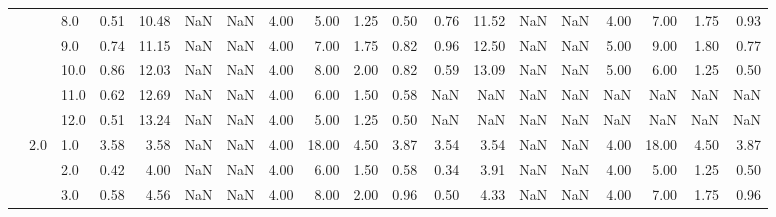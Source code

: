 \begin{tabular}{lllrrrrrrrrrrrrrrrr}
       &     & 8.0  &      0.51 &      10.48 &               NaN &                NaN & 4.00 &   5.00 &             1.25 &                         0.50 &      0.76 &      11.52 &               NaN &                NaN & 4.00 &   7.00 &             1.75 &                         0.93 \\
       &     & 9.0  &      0.74 &      11.15 &               NaN &                NaN & 4.00 &   7.00 &             1.75 &                         0.82 &      0.96 &      12.50 &               NaN &                NaN & 5.00 &   9.00 &             1.80 &                         0.77 \\
       &     & 10.0 &      0.86 &      12.03 &               NaN &                NaN & 4.00 &   8.00 &             2.00 &                         0.82 &      0.59 &      13.09 &               NaN &                NaN & 5.00 &   6.00 &             1.25 &                         0.50 \\
       &     & 11.0 &      0.62 &      12.69 &               NaN &                NaN & 4.00 &   6.00 &             1.50 &                         0.58 &       NaN &        NaN &               NaN &                NaN &  NaN &    NaN &              NaN &                          NaN \\
       &     & 12.0 &      0.51 &      13.24 &               NaN &                NaN & 4.00 &   5.00 &             1.25 &                         0.50 &       NaN &        NaN &               NaN &                NaN &  NaN &    NaN &              NaN &                          NaN \\
       & 2.0 & 1.0  &      3.58 &       3.58 &               NaN &                NaN & 4.00 &  18.00 &             4.50 &                         3.87 &      3.54 &       3.54 &               NaN &                NaN & 4.00 &  18.00 &             4.50 &                         3.87 \\
       &     & 2.0  &      0.42 &       4.00 &               NaN &                NaN & 4.00 &   6.00 &             1.50 &                         0.58 &      0.34 &       3.91 &               NaN &                NaN & 4.00 &   5.00 &             1.25 &                         0.50 \\
       &     & 3.0  &      0.58 &       4.56 &               NaN &                NaN & 4.00 &   8.00 &             2.00 &                         0.96 &      0.50 &       4.33 &               NaN &                NaN & 4.00 &   7.00 &             1.75 &                         0.96 \\

\end{tabular}
